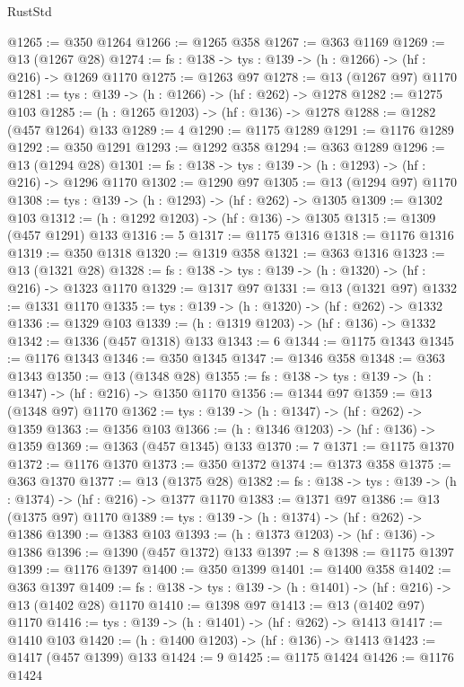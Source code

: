 \begin{lexlean}{RustStd}
\begin{coremodule}
@1265 := @350 @1264
@1266 := @1265 @358
@1267 := @363 @1169
@1269 := @13 (@1267 @28)
@1274 := {fs : @138} -> {tys : @139} -> (h : @1266) -> (hf : @216) -> @1269 @1170
@1275 := @1263 @97
@1278 := @13 (@1267 @97) @1170
@1281 := {tys : @139} -> (h : @1266) -> (hf : @262) -> @1278
@1282 := @1275 @103
@1285 := (h : @1265 @1203) -> (hf : @136) -> @1278
@1288 := @1282 (@457 @1264) @133
@1289 := 4
@1290 := @1175 @1289
@1291 := @1176 @1289
@1292 := @350 @1291
@1293 := @1292 @358
@1294 := @363 @1289
@1296 := @13 (@1294 @28)
@1301 := {fs : @138} -> {tys : @139} -> (h : @1293) -> (hf : @216) -> @1296 @1170
@1302 := @1290 @97
@1305 := @13 (@1294 @97) @1170
@1308 := {tys : @139} -> (h : @1293) -> (hf : @262) -> @1305
@1309 := @1302 @103
@1312 := (h : @1292 @1203) -> (hf : @136) -> @1305
@1315 := @1309 (@457 @1291) @133
@1316 := 5
@1317 := @1175 @1316
@1318 := @1176 @1316
@1319 := @350 @1318
@1320 := @1319 @358
@1321 := @363 @1316
@1323 := @13 (@1321 @28)
@1328 := {fs : @138} -> {tys : @139} -> (h : @1320) -> (hf : @216) -> @1323 @1170
@1329 := @1317 @97
@1331 := @13 (@1321 @97)
@1332 := @1331 @1170
@1335 := {tys : @139} -> (h : @1320) -> (hf : @262) -> @1332
@1336 := @1329 @103
@1339 := (h : @1319 @1203) -> (hf : @136) -> @1332
@1342 := @1336 (@457 @1318) @133
@1343 := 6
@1344 := @1175 @1343
@1345 := @1176 @1343
@1346 := @350 @1345
@1347 := @1346 @358
@1348 := @363 @1343
@1350 := @13 (@1348 @28)
@1355 := {fs : @138} -> {tys : @139} -> (h : @1347) -> (hf : @216) -> @1350 @1170
@1356 := @1344 @97
@1359 := @13 (@1348 @97) @1170
@1362 := {tys : @139} -> (h : @1347) -> (hf : @262) -> @1359
@1363 := @1356 @103
@1366 := (h : @1346 @1203) -> (hf : @136) -> @1359
@1369 := @1363 (@457 @1345) @133
@1370 := 7
@1371 := @1175 @1370
@1372 := @1176 @1370
@1373 := @350 @1372
@1374 := @1373 @358
@1375 := @363 @1370
@1377 := @13 (@1375 @28)
@1382 := {fs : @138} -> {tys : @139} -> (h : @1374) -> (hf : @216) -> @1377 @1170
@1383 := @1371 @97
@1386 := @13 (@1375 @97) @1170
@1389 := {tys : @139} -> (h : @1374) -> (hf : @262) -> @1386
@1390 := @1383 @103
@1393 := (h : @1373 @1203) -> (hf : @136) -> @1386
@1396 := @1390 (@457 @1372) @133
@1397 := 8
@1398 := @1175 @1397
@1399 := @1176 @1397
@1400 := @350 @1399
@1401 := @1400 @358
@1402 := @363 @1397
@1409 := {fs : @138} -> {tys : @139} -> (h : @1401) -> (hf : @216) -> @13 (@1402 @28) @1170
@1410 := @1398 @97
@1413 := @13 (@1402 @97) @1170
@1416 := {tys : @139} -> (h : @1401) -> (hf : @262) -> @1413
@1417 := @1410 @103
@1420 := (h : @1400 @1203) -> (hf : @136) -> @1413
@1423 := @1417 (@457 @1399) @133
@1424 := 9
@1425 := @1175 @1424
@1426 := @1176 @1424

\end{coremodule}
\end{lexlean}
